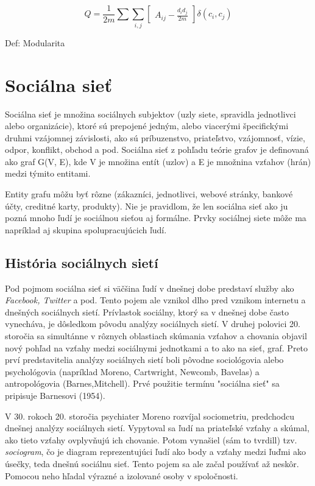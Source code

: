\documentclass[slovak,master,public,dept460,male,cpdeclaration,oneside]{diploma}
\begin{document}
\begin{mycapequ}[!ht]
      \begin{equation*}    
{
Q = \frac{1}{2m}\sum \sum_{i,j}\begin{bmatrix}
A_{ij} - \frac{d_{i}d_{j}}{2m}
\end{bmatrix} \delta (c_{i}, c_{j})
}
   \end{equation*}
   \caption{Def: Modularita \cite{blondel2008fast}}
\end{mycapequ}


\section{Sociálna sieť}

Sociálna sieť je množina sociálnych subjektov (uzly siete, spravidla jednotlivci alebo organizácie),
ktoré sú prepojené jedným, alebo viacerými špecifickými druhmi vzájomnej závislosti, ako sú príbuzenstvo, priateľstvo, vzájomnosť, vízie, odpor, konflikt, obchod a pod.
Sociálna sieť z pohľadu teórie grafov je definovaná ako graf G(V, E), kde V je množina entít
(uzlov) a E je množnina vzťahov (hrán) medzi týmito entitami.

Entity grafu môžu byť rôzne (zákazníci, jednotlivci, webové stránky, bankové účty, creditné karty,
produkty). Nie je pravidlom, že len sociálna sieť ako ju pozná mnoho ľudí je sociálnou sieťou aj formálne. Prvky sociálnej siete môže ma napríklad aj skupina spolupracujúcich ľudí. 

\subsection{História sociálnych sietí}

Pod pojmom sociálna sieť si väčšina ľudí v dnešnej dobe predstaví služby ako \textit{Facebook, Twitter} a pod. Tento pojem ale vznikol dlho pred vznikom internetu a dnešných sociálnych sietí. Prívlastok sociálny, ktorý sa v dnešnej dobe často vynecháva, je dôsledkom pôvodu analýzy sociálnych sietí. V druhej polovici 20. storočia sa simultánne v rôznych oblastiach skúmania vzťahov a chovania objavil nový pohľad na vzťahy medzi sociálnymi jednotkami a to ako na sieť, graf. Preto prví predstavitelia analýzy sociálnych sietí boli pôvodne sociológovia alebo psychológovia (napríklad Moreno, Cartwright, Newcomb, Bavelas) a antropológovia (Barnes,Mitchell). Prvé použitie termínu "sociálna sieť" sa pripisuje Barnesovi (1954).

V 30. rokoch 20. storočia psychiater Moreno rozvíjal sociometriu, predchodcu dnešnej analýzy sociálnych sietí. Vypytoval sa ľudí na priateľské vzťahy a skúmal, ako tieto vzťahy ovplyvňujú ich chovanie. Potom vynašiel (sám to tvrdill) tzv. \textit{sociogram}, čo je diagram reprezentujúci ľudí ako body a vzťahy medzi ľuďmi ako úsečky, teda dnešnú sociálnu sieť. Tento pojem sa ale začal používať až neskôr. Pomocou neho hľadal výrazné a izolované osoby v spoločnosti.
\end{document}
